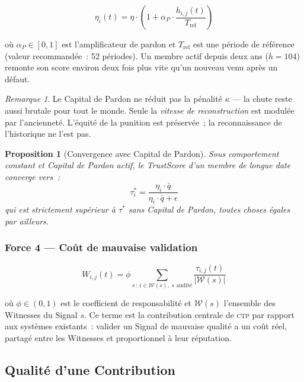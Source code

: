 \documentclass[12pt,a4paper]{article}
\theoremstyle{definition}
\theoremstyle{plain}
\newtheorem{proposition}{Proposition}[section]
\theoremstyle{remark}
\newtheorem{remarque}{Remarque}[section]
\newcommand{\CTP}{\textsc{ctp}}
\newcommand{\trustscore}{\tau}
\newcommand{\1}{\mathbf{1}}
\begin{document}
\begin{equation}
\boxed{\eta_i(t) = \eta \cdot \left(1 + \alpha_P \cdot
\frac{h_{i,j}(t)}{T_{\text{ref}}}\right)}
\label{eq:pardon}
\end{equation}

où $\alpha_P \in [0,1]$ est l'amplificateur de pardon et
$T_{\text{ref}}$ est une période de référence (valeur recommandée~:
52 périodes). Un membre actif depuis deux ans ($h = 104$) remonte
son score environ deux fois plus vite qu'un nouveau venu après un défaut.

\begin{remarque}
Le Capital de Pardon ne réduit pas la pénalité $\kappa$ --- la chute
reste aussi brutale pour tout le monde. Seule la \emph{vitesse de
reconstruction} est modulée par l'ancienneté. L'équité de la punition
est préservée~; la reconnaissance de l'historique ne l'est pas.
\end{remarque}

\begin{proposition}[Convergence avec Capital de Pardon]
Sous comportement constant et Capital de Pardon actif, le TrustScore
d'un membre de longue date converge vers~:
$$\trustscore_i^* = \frac{\eta_i \cdot \bar{q}}{\eta_i \cdot \bar{q} + \epsilon}$$
qui est strictement supérieur à $\trustscore^*$ sans Capital de Pardon,
toutes choses égales par ailleurs.
\end{proposition}

\subsubsection{Force 4 --- Coût de mauvaise validation}

\begin{equation}
W_{i,j}(t) = \phi \sum_{s \,:\, i \in \mathcal{W}(s),\; s \text{ audité}}
\frac{\trustscore_{i,j}(t)}{|\mathcal{W}(s)|}
\label{eq:witness_cost}
\end{equation}

où $\phi \in (0,1)$ est le coefficient de responsabilité et $\mathcal{W}(s)$
l'ensemble des Witnesses du Signal $s$. Ce terme est la contribution centrale
de \CTP{} par rapport aux systèmes existants~: valider un Signal de mauvaise
qualité a un coût réel, partagé entre les Witnesses et proportionnel à leur
réputation.

\subsection{Qualité d'une Contribution}
\end{document}
